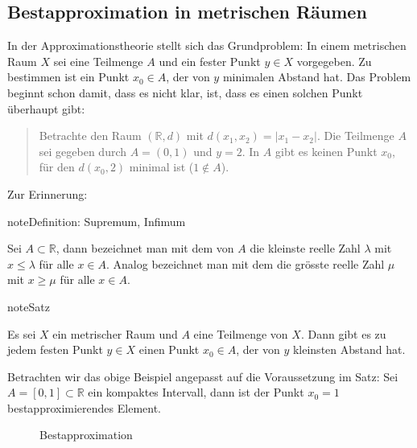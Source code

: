 \documentclass[letterpaper,10pt,english]{jupyterBook}
\let\sphinxpxdimen\pdfpxdimen\else\newdimen\sphinxpxdimen
\begin{document}
\subsection{Bestapproximation in metrischen Räumen}
\label{\detokenize{Funktionalanalysis/GrundlegendeRaeume:bestapproximation-in-metrischen-raumen}}\label{\detokenize{Funktionalanalysis/GrundlegendeRaeume:bestapproximationmetrisch}}
In der Approximationstheorie stellt sich das Grundproblem: In einem metrischen Raum \(X\) sei eine Teilmenge \(A\) und ein fester Punkt \(y\in X\) vorgegeben. Zu bestimmen ist ein Punkt \(x_0 \in A\), der von \(y\) minimalen Abstand hat. Das Problem beginnt schon damit, dass es nicht klar, ist, dass es einen solchen Punkt überhaupt gibt:
\begin{quote}

Betrachte den Raum \((\mathbb{R}, d)\) mit \(d(x_1,x_2) = |x_1-x_2|\). Die Teilmenge \(A\) sei gegeben durch \(A = (0,1)\) und \(y=2\). In \(A\) gibt es keinen Punkt \(x_0\), für den \(d(x_0,2)\) minimal ist (\(1\not\in A\)).
\end{quote}

Zur Erinnerung:

\begin{sphinxadmonition}{note}{Definition: Supremum, Infimum}

Sei \(A\subset \mathbb{R}\), dann bezeichnet man mit dem  von \(A\) die kleinste reelle Zahl \(\lambda\) mit \(x\le \lambda\) für alle \(x\in A\). Analog bezeichnet man mit dem  die grösste reelle Zahl \(\mu\) mit \(x\ge \mu\) für alle \(x\in A\).
\end{sphinxadmonition}

\begin{sphinxadmonition}{note}{Satz}

Es sei \(X\) ein metrischer Raum und \(A\) eine  Teilmenge von \(X\). Dann gibt es zu jedem festen Punkt \(y \in X\) einen Punkt \(x_0 \in A\), der von \(y\) kleinsten Abstand hat.
\end{sphinxadmonition}

Betrachten wir das obige Beispiel angepasst auf die Voraussetzung im Satz: Sei \(A = [0,1] \subset \mathbb{R}\) ein kompaktes Intervall, dann ist der Punkt \(x_0 = 1\) bestapproximierendes Element.


\begin{wrapfigure}{l}{0pt}
\centering
\noindent\sphinxincludegraphics[height=250\sphinxpxdimen]{{Bestapproximation}.png}
\caption{Bestapproximation}\label{\detokenize{Funktionalanalysis/GrundlegendeRaeume:directive-fig}}\end{wrapfigure}
\end{document}
